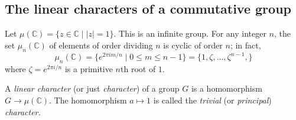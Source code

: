 \documentclass[a4paper,11pt,final,openany]{memoir}%
\theoremstyle{nonumberplain}
\begin{document}

\subsection{The linear characters of a commutative group}

Let $\mu(\mathbb{C}{})=\{z\in\mathbb{C}{}\mid|z|=1\}$. This is an infinite
group. For any integer $n$, the set $\mu_{n}(\mathbb{C}{})$ of elements of
order dividing $n$ is cyclic of order $n$; in fact,%
\[
\mu_{n}(\mathbb{C}{})=\{e^{2\pi im/n}\mid0\leq m\leq n-1\}=\{1,\zeta
,\ldots,\zeta^{n-1},\}
\]
where $\zeta=e^{2\pi i/n}$ is a primitive $n$th root of $1$.

A \emph{linear character} (or just \emph{character}) of a group $G$ is a
homomorphism $G\rightarrow\mu(\mathbb{C}{})$. The homomorphism $a\mapsto1$ is
called the \emph{trivial} (or \emph{principal}) \emph{character.}
\end{document}
